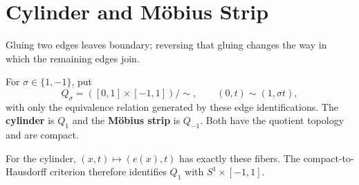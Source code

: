 \section{Cylinder and M\"obius Strip}\label{sec:quotient-bands}
Gluing two edges leaves boundary; reversing that gluing changes the way
in which the remaining edges join.
\begin{definition}
For $\sigma\in\{1,-1\}$, put
\[
Q_\sigma=([0,1]\times[-1,1])/{\sim},\qquad (0,t)\sim(1,\sigma t),
\]
with only the equivalence relation generated by these edge identifications.
The \textbf{cylinder} is $Q_1$ and the \textbf{M\"obius strip} is $Q_{-1}$.
Both have the quotient topology and are compact.
\end{definition}

\FloatBarrier

For the cylinder, $(x,t)\mapsto(e(x),t)$ has exactly these fibers. The
compact-to-Hausdorff criterion therefore identifies $Q_1$ with
$S^1\times[-1,1]$.

